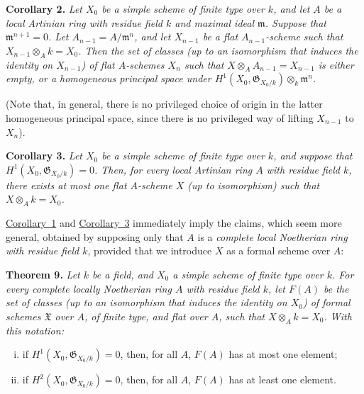 \documentclass{article}
\newenvironment{itenv}[1]
  {\phantomsection\par\medskip\noindent\textbf{#1.}\itshape}
  {\par\medskip}
\newcommand{\fk}{\mathfrak}
\newcommand{\oldpage}[1]{\marginpar{\footnotesize$\Big\vert$ \textit{p.~#1}}}
\begin{document}
\begin{itenv}{Corollary 2}
\label{theorem8corollary2}
  Let $X_0$ be a simple scheme of finite type over $k$, and let $A$ be a local Artinian ring with residue field $k$ and maximal ideal $\fk{m}$.
  Suppose that $\fk{m}^{n+1}=0$.
  Let $A_{n-1}=A/\fk{m}^n$, and let $X_{n-1}$ be a flat $A_{n-1}$-scheme such that $X_{n-1}\otimes_Ak=X_0$.
  Then the set of classes (up to an isomorphism that induces the identity on $X_{n-1}$) of flat $A$-schemes $X_n$ such that $X\otimes_AA_{n-1}=X_{n-1}$ is either empty, or a homogeneous principal space under $H^1(X_0,\fk{G}_{X_0/k})\otimes_k\fk{m}^n$.
\end{itenv}

(Note that, in general, there is no privileged choice of origin in the latter homogeneous principal space, since there is no privileged way of lifting $X_{n-1}$ to $X_n$).

\begin{itenv}{Corollary 3}
\label{theorem8corollary3}
  Let $X_0$ be a simple scheme of finite type over $k$, and suppose that $H^1(X_0,\fk{G}_{X_0/k})=0$.
  Then, for every local Artinian ring $A$ with residue field $k$, \emph{there exists at most one flat $A$-scheme $X$} (up to isomorphism) such that $X\otimes_Ak=X_0$.
\end{itenv}

\hyperref[theorem8corollary1]{Corollary~1} and \hyperref[theorem8corollary3]{Corollary~3} immediately imply the claims, which seem more general, obtained by supposing only that $A$ is a \emph{complete local Noetherian ring with residue field $k$}, provided that we introduce $X$ as a formal scheme over $A$:

\begin{itenv}{Theorem 9}
\label{theorem9}
  Let $k$ be a field, and $X_0$ a \emph{simple} scheme of finite type over $k$.
  For every complete locally Noetherian ring $A$ with residue field $k$, let $F(A)$ be the set of classes (up to an isomorphism that induces the identity on $X_0$)
\oldpage{182-14}
  of formal schemes $\fk{X}$ over $A$, of finite type, and flat over $A$, such that $X\otimes_Ak=X_0$.
  With this notation:
  \begin{enumerate}[i.]
    \item if $H^1(X_0,\fk{G}_{X_0/k})=0$, then, for all $A$, $F(A)$ has at most one element;
    \item if $H^2(X_0,\fk{G}_{X_0/k})=0$, then, for all $A$, $F(A)$ has at least one element.
  \end{enumerate}
\end{itenv}
\end{document}
